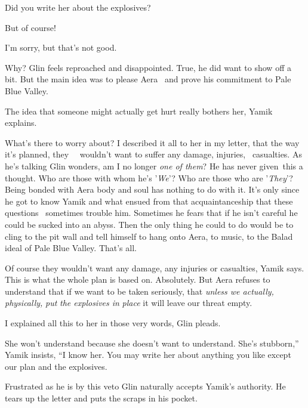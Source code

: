 \documentclass[letterpaper]{article}
\begin{document}
{\textquotedbl}Did you write her about the explosives?{\textquotedbl} 

{\textquotedbl}But of course!{\textquotedbl}~ 

{\textquotedbl}I'm sorry, but that's not good.{\textquotedbl} 

{\textquotedbl}Why?{\textquotedbl} Glin feels reproached and disappointed. True, he did want to show off a bit. But the
main idea was to please Aera \ and prove his commitment to Pale Blue Valley. 

{\textquotedbl}The idea that someone might actually get hurt really bothers her,{\textquotedbl} Yamik explains.

{\textquotedbl}What's there to worry about? I described it all to her in my letter, that the way it's planned, they
\ \ wouldn't want to suffer any damage, injuries, \ casualties.{\textquotedbl} As he's talking Glin wonders, am I no
longer \textit{one of them}?\textcolor[rgb]{0.0,0.4392157,0.7529412}{ }He has never given~this a thought. Who are those
with whom he's '\textit{We}{}'? Who are those who are '\textit{They}{}'? Being bonded with Aera body and soul has
nothing to do with it. It's only since he got to know Yamik and what ensued from that acquaintanceship that these
questions \ sometimes trouble him. Sometimes he fears that if he isn't careful he could be sucked into an abyss. Then
the only thing he could to do would be to cling to the pit wall and tell himself to hang onto Aera, to music, to the
Balad ideal of Pale Blue Valley. That's all. 

{\textquotedbl}Of course they wouldn't want any damage, any injuries or casualties,{\textquotedbl} Yamik says.
{\textquotedbl}This is what the whole plan is based on. Absolutely. But Aera refuses to understand that if we want to
be taken seriously, that \textit{unless we actually, physically,} \textit{put} \textit{the explosives in} \textit{place
}it will leave our threat empty.{\textquotedbl} 

{\textquotedbl}I explained all this to her in those very words,{\textquotedbl} Glin pleads. 

{\textquotedbl}She won't understand because she doesn't want to understand. She's stubborn,'' Yamik insists, ``I know
her. You may write her about anything you like except our plan and the explosives.{\textquotedbl} 

Frustrated as he is by this veto Glin naturally accepts Yamik's authority. He tears up the letter and puts the scraps in
his pocket. 
\end{document}
